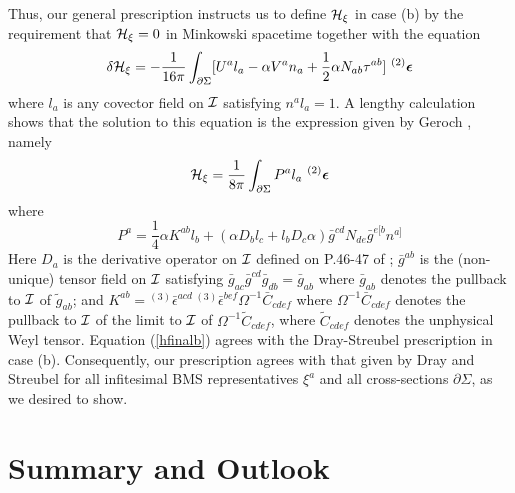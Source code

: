 Thus, our general prescription instructs us to define ${\cal H}_\xi$
in case (b) by the requirement that ${\cal H}_\xi = 0$ in Minkowski
spacetime together with the equation
\begin{equation}
\delta {\cal H}_\xi = - \frac{1}{16 \pi} \int_{\partial \Sigma} [U^a
l_a - \alpha V^a n_a + \frac{1}{2} \alpha N_{ab}
\tau^{ab}] \,\, {}^{(2)} {\mbox{\boldmath $\epsilon$}}
\label{dhfinalb}
\end{equation}
where $l_a$ is any covector field on $\cal I$ satisfying $n^a l_a =
1$.  A lengthy calculation \cite{i} shows that the solution
to this equation is the expression given by Geroch \cite{g}, namely
\begin{equation}
{\cal H}_\xi = \frac{1}{8 \pi} \int_{\partial \Sigma} P^a
l_a  \,\, {}^{(2)} {\mbox{\boldmath $\epsilon$}}
\label{hfinalb}
\end{equation}
where
\begin{equation}
P^a = \frac{1}{4} \alpha K^{ab} l_b + (\alpha {D}_b l_c + l_b
{D}_c \alpha) \bar{g}^{cd} N_{de} \bar{g}^{e[b} n^{a]}
\label{Pg}
\end{equation}
Here ${D}_a$ is the derivative operator on $\cal I$ defined on P.46-47
of \cite{g}; $\bar{g}^{ab}$ is the (non-unique) tensor field on $\cal
I$ satisfying $\bar{g}_{ac} \bar{g}^{cd} \bar{g}_{db} = \bar{g}_{ab}$
where $\bar{g}_{ab}$ denotes the pullback to $\cal I$ of
$\tilde{g}_{ab}$; and $K^{ab} = {}^{(3)} \bar{\epsilon}^{acd} \,
{}^{(3)} \bar{\epsilon}^{bef} \Omega^{-1} \bar{C}_{cdef}$ where
$\Omega^{-1} \bar{C}_{cdef}$ denotes the pullback to $\cal I$ of the
limit to $\cal I$ of $\Omega^{-1} \tilde{C}_{cdef}$, where
$\tilde{C}_{cdef}$ denotes the unphysical Weyl tensor. Equation
(\ref{hfinalb}) agrees with the Dray-Streubel prescription in case
(b). Consequently, our prescription agrees with that given by Dray and
Streubel for all infitesimal BMS representatives $\xi^a$ and all
cross-sections $\partial \Sigma$, as we desired to show.


\section{Summary and Outlook}

